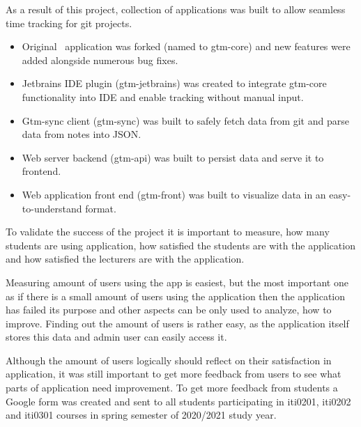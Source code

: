 As a result of this project, collection of applications was built to allow seamless time tracking for git projects.
\begin{itemize}
    \item Original~ application was forked (named to gtm-core) and new features were added
    alongside numerous bug fixes.
    \item Jetbrains IDE plugin (gtm-jetbrains) was created to integrate gtm-core functionality into IDE and enable tracking without manual input.
    \item Gtm-sync client (gtm-sync) was built to safely fetch data from git and parse data from notes into JSON.
    \item Web server backend (gtm-api) was built to persist data and serve it to frontend.
    \item Web application front end (gtm-front) was built to visualize data in an easy-to-understand format.
\end{itemize}

To validate the success of the project it is important to measure, how many students are using application,
how satisfied the students are with the application and how satisfied the lecturers are with the application.

Measuring amount of users using the app is easiest, but the most important one as if there is a small amount of users using
the application then the application has failed its purpose and other aspects can be only used to analyze, how
to improve.
Finding out the amount of users is rather easy, as the application itself stores this data and admin user can easily access it.

Although the amount of users logically should reflect on their satisfaction in application, it was still important to
get more feedback from users to see what parts of application need improvement.
To get more feedback from students a Google form was created and sent to all students participating in iti0201, iti0202
and iti0301 courses in spring semester of 2020/2021 study year.

